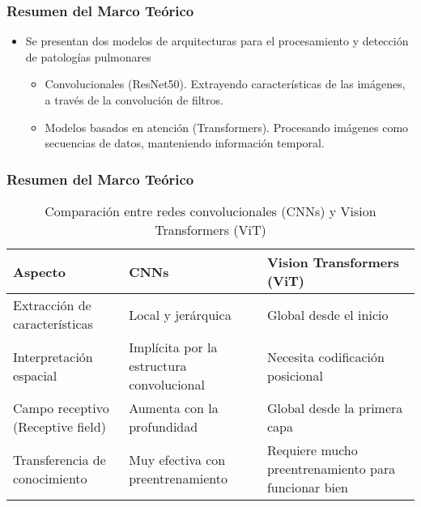 \begin{frame}
\frametitle{Resumen del Marco Teórico}
\begin{itemize}
    \item Se presentan dos modelos de arquitecturas para el procesamiento y detección de patologías pulmonares
        \begin{itemize}
            \item Convolucionales (ResNet50). Extrayendo características de las imágenes, a través de la convolución de filtros.
            \item Modelos basados en atención (Transformers). Procesando imágenes como secuencias de datos, manteniendo información temporal.
        \end{itemize}
\end{itemize}
\end{frame}

\begin{frame}
\frametitle{Resumen del Marco Teórico}
\begin{table}[h!]
    \centering
    \fontsize{8}{9}\selectfont
    \begin{tabular}{|p{3cm}|p{3.5cm}|p{3.5cm}|}
        \hline
        \textbf{Aspecto} & \textbf{CNNs} & \textbf{Vision Transformers (ViT)} \\
        \hline
        Extracción de características & Local y jerárquica & Global desde el inicio \\
        \hline
        Interpretación espacial & Implícita por la estructura convolucional & Necesita codificación posicional \\
        \hline
        Campo receptivo (Receptive field) & Aumenta con la profundidad & Global desde la primera capa \\
        \hline
        Transferencia de conocimiento & Muy efectiva con preentrenamiento & Requiere mucho preentrenamiento para funcionar bien \\
        \hline
    \end{tabular}
    \caption{Comparación entre redes convolucionales (CNNs) y Vision Transformers (ViT)}
    \label{tab:comparacion_cnns_vit}
\end{table}
\end{frame}
